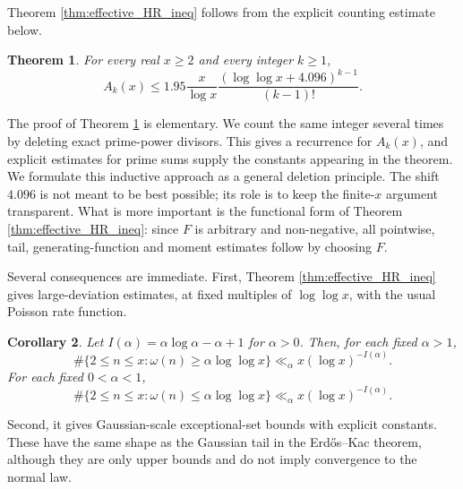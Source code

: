 \documentclass[12pt,a4paper,reqno]{amsart}
\theoremstyle{plain}
\newtheorem{thrm}{Theorem}[section]
\newtheorem{crllry}[thrm]{Corollary}
\numberwithin{sblmm}{thrm}
\numberwithin{equation}{section}
\begin{document}
Theorem \ref{thm:effective_HR_ineq} follows from the explicit counting estimate below.

\begin{thrm}\label{thm:HR_original_effective}
    For every real $x\ge 2$ and every integer $k\ge 1$,
    \begin{equation}\label{eqn:HR_original_effective}
        A_k(x)\le 1.95\frac{x}{\log x}\frac{(\log\log x+4.096)^{k-1}}{(k-1)!}.
    \end{equation}
\end{thrm}
The proof of Theorem \ref{thm:HR_original_effective} is elementary. We count the same integer several times by deleting exact prime-power divisors. This gives a recurrence for $A_k(x)$, and explicit estimates for prime sums supply the constants appearing in the theorem. We formulate this inductive approach as a general deletion principle. The shift $4.096$ is not meant to be best possible; its role is to keep the finite-$x$ argument transparent. What is more important is the functional form of Theorem \ref{thm:effective_HR_ineq}: since $F$ is arbitrary and non-negative, all pointwise, tail, generating-function and moment estimates follow by choosing $F$.

Several consequences are immediate. First, Theorem \ref{thm:effective_HR_ineq} gives large-deviation estimates, at fixed multiples of $\log\log x$, with the usual Poisson rate function.

\begin{crllry}\label{cor:fixed_mult_large_deviations}
    Let $I(\alpha)=\alpha\log\alpha-\alpha+1$ for $\alpha>0$. Then, for each fixed $\alpha>1$,
    \begin{equation}\label{eqn:cor_fixed_mult_1}
        \#\{2\le n\le x:\omega(n)\ge\alpha\log\log x\}\ll_{\alpha}x(\log x)^{-I(\alpha)}.
    \end{equation}
    For each fixed $0<\alpha<1$,
    \begin{equation}\label{eqn:cor_fixed_mult_2}
        \#\{2\le n\le x:\omega(n)\le\alpha\log\log x\}\ll_{\alpha}x(\log x)^{-I(\alpha)}.
    \end{equation}
\end{crllry}

Second, it gives Gaussian-scale exceptional-set bounds with explicit constants. These have the same shape as the Gaussian tail in the Erd\H{o}s--Kac theorem, although they are only upper bounds and do not imply convergence to the normal law.
\end{document}

